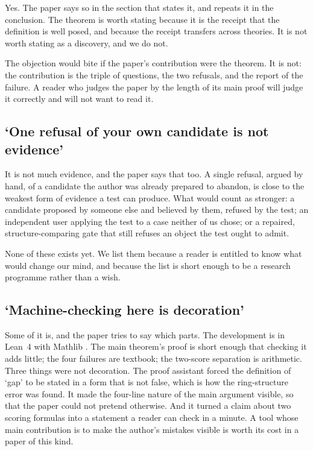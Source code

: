\documentclass[12pt,a4paper]{article}
\begin{document}
Yes.  The paper says so in the section that states it, and repeats it in the
conclusion.  The theorem is worth stating because it is the receipt that the
definition is well posed, and because the receipt transfers across theories.  It is
not worth stating as a discovery, and we do not.

The objection would bite if the paper's contribution were the theorem.  It is not:
the contribution is the triple of questions, the two refusals, and the report of
the failure.  A reader who judges the paper by the length of its main proof will
judge it correctly and will not want to read it.

\subsection{`One refusal of your own candidate is not evidence'}

It is not much evidence, and the paper says that too.  A single refusal, argued by
hand, of a candidate the author was already prepared to abandon, is close to the
weakest form of evidence a test can produce.  What would count as stronger: a
candidate proposed by someone else and believed by them, refused by the test; an
independent user applying the test to a case neither of us chose; or a repaired,
structure-comparing gate that still refuses an object the test ought to admit.

None of these exists yet.  We list them because a reader is entitled to know what
would change our mind, and because the list is short enough to be a research
programme rather than a wish.

\subsection{`Machine-checking here is decoration'}

Some of it is, and the paper tries to say which parts.  The development is in
Lean~4 \citep{lean} with Mathlib \citep{mathlib}.  The main theorem's proof is
short enough that checking it adds little; the four failures are textbook; the
two-score separation is arithmetic.  Three things were not decoration.  The proof
assistant forced the definition of `gap' to be stated in a form that is not false,
which is how the ring-structure error was found.  It made the four-line nature of
the main argument visible, so that the paper could not pretend otherwise.  And it
turned a claim about two scoring formulas into a statement a reader can check in a
minute.  A tool whose main contribution is to make the author's mistakes visible is
worth its cost in a paper of this kind.
\end{document}
